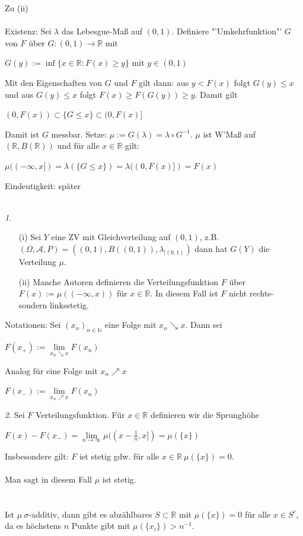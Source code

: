 \documentclass[10pt,a4paper]{report}
\newcommand{\N}{\mathbb{N}}
\newcommand{\R}{\mathbb{R}}
\numberwithin{equation}{section}
\numberwithin{figure}{section}
\theoremstyle{plain}
\theoremstyle{definition}
\theoremstyle{plain}
\theoremstyle{definition}
\theoremstyle{remark}
\newtheorem{rem}{\protect\remarkname}[section]
\theoremstyle{plain}
\theoremstyle{plain}
\theoremstyle{plain}
\theoremstyle{plain}
\theoremstyle{plain}
\providecommand{\remarkname}{Bemerkung}
\newcommand{\1}{ \mathbb{1} } %
\begin{document}
Zu (ii)\\\\
Existenz: Sei $\lambda$ das Lebesgue-Maß auf $(0,1)$. Definiere "'Umkehrfunktion"' $G$ von $F$ über $G:(0,1) \to \R$ mit
\begin{center}
$G(y):=\inf\{x \in \R:F(x)\geq y\}$ mit $y \in (0,1)$
\end{center}
Mit den Eigenschaften von $G$ und $F$ gilt dann: aus $y<F(x)$ folgt $G(y)\leq x$ und aus $G(y)\leq x$ folgt $F(x)\geq F(G(y))\geq y$. Damit gilt
\begin{center}
$(0,F(x)) \subset \{G\leq x\}\subset (0,F(x)]$
\end{center}
Damit ist $G$ messbar. Setze: $\mu:=G(\lambda)=\lambda\circ G^{-1}$. $\mu$ ist W'Maß auf $(\R,B(\R))$ und für alle $x \in \R$ gilt:
\begin{center}
$\mu((-\infty,x])=\lambda(\{G\leq x\})=\lambda((0,F(x)])=F(x)$
\end{center} 
Eindeutigkeit: später\\\\
\begin{rem}
  \begin{itemize}
  \item[(i)] Sei $Y$ eine ZV mit Gleichverteilung auf $(0,1)$,
    z.B. $(\Omega,\mathcal{A},P)=((0,1),B((0,1)),\lambda_{|(0,1)})$
    dann hat $G(Y)$ die Verteilung $\mu$.
  \item[(ii)] Manche Autoren definieren die Verteilungsfunktion $F$
    über $F(x):=\mu((-\infty,x))$ für $x \in \R$. In diesem Fall ist
    $F$ nicht rechts- sondern linksstetig.
  \end{itemize}
  Notationen: Sei $(x_n)_{n \in \N}$ eine Folge mit $x_n\searrow
  x$. Dann sei
  \begin{center}
    $F(x_+):=\lim\limits_{x_n\searrow x} F(x_n)$
  \end{center}
  Analog für eine Folge mit $x_n\nearrow x$
  \begin{center}
    $F(x_-):=\lim\limits_{x_n\nearrow x} F(x_n)$
  \end{center}
\end{rem}
\begin{rem}
  Sei $F$ Verteilungsfunktion. Für $x \in \R$ definieren wir die
  Sprunghöhe
  \begin{center}
    $F(x)-F(x_-)=\lim\limits_{n \to \infty}
    \mu((x-\frac{1}{n},x])=\mu(\{x\})$
  \end{center}
  Insbesondere gilt: $F$ ist stetig gdw. für alle $x \in \R ~ \mu(\{x\})=0$.\\\\
  Man sagt in diesem Fall $\mu$ ist stetig.\\\\\\
  Ist $\mu~ \sigma$-additiv, dann gibt es abzählbares $S \subset \R$ mit $\mu(\{x\})=0$ für alle $x \in S^c$, da es höchstens $n$ Punkte gibt mit $\mu(\{x_i\})>n^{-1}$. \\\\
\end{rem}
\end{document}
